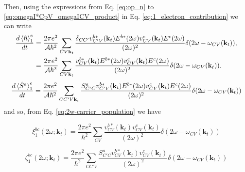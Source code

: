 \documentclass{article}
\newcommand{\kt}{\mathbf{k}_{t}}
\newcommand{\dw}{\delta(2\omega - \omega_{CV}(\kt))}
\begin{document}
Then, using the expressions from Eq. \eqref{eq:op_n} to
\eqref{eq:omegaI*CpV_omegaICV_product} in Eq. 
\eqref{eq:1_electron_contribution} we can write
\begin{align}
\frac{d\ev*{\hat{n}}^{e}_{1}}{dt} &= 
\frac{2\pi e^{2}}{\mathcal{A}\hbar^{2}} \sum_{CV\kt}
\frac{\delta_{CC'}v^{b*}_{C'V}(\kt)E^{b*}(2\omega)v^{c}_{CV}(\kt)
E^{c}(2\omega)}{(2\omega)^{2}} \dw , \nonumber \\
&= \frac{2\pi e^{2}}{\mathcal{A}\hbar^{2}} \sum_{CV\kt}
\frac{v^{b*}_{CV}(\kt)E^{b*}(2\omega)v^{c}_{CV}(\kt)
E^{c}(2\omega)}{(2\omega)^{2}} \dw . \label{eq:2w_n-final}
\end{align}
\begin{equation}\label{2w_eq:S-final}
\frac{d\ev*{\hat{S}^{a}}^{e}_{1}}{dt} = 
\frac{2\pi e^{2}}{\mathcal{A}\hbar^{2}} \sum_{CC'V\kt} 
\frac{S^{a}_{C'C}v^{b*}_{C'V}(\kt)E^{b*}(2\omega)v^{c}_{CV}(\kt)E^{c}(2\omega)}
{(2\omega)^{2}}\dw
\end{equation}
and so, from Eq. \eqref{eq:2w-carrier_population} we have 

\begin{equation}\label{eq:1_carrier_tensor}
\xi^{bc}_{1}(2\omega;\kt) = \frac{2\pi e^{2}}{\hbar^{2}} 
\sum_{CV} \frac{v^{b*}_{CV}(\kt)v^{c}_{CV}(\kt)}{(2\omega)^{2}} \dw
\end{equation}

\begin{equation}\label{eq:1_spin_tensor}
\zeta^{bc}_{1}(2\omega;\kt) = \frac{2\pi e^{2}}{\hbar^{2}} 
\sum_{CC'V} \frac{S^{a}_{C'C}v^{b*}_{CV}(\kt)v^{c}_{CV}(\kt)}{(2\omega)^{2}} \dw
\end{equation}
\end{document}
